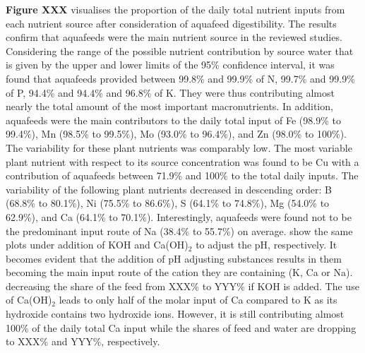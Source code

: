 \documentclass[
]{article}
\begin{document}
\textbf{Figure XXX} visualises the proportion of the daily total nutrient inputs from each nutrient source after consideration of aquafeed digestibility.
The results confirm that aquafeeds were the main nutrient source in the reviewed studies. Considering the range of the possible nutrient contribution by source water that is given by the upper and lower limits of the 95\% confidence interval, it was found that aquafeeds provided between 99.8\% and 99.9\% of N, 99.7\% and 99.9\% of P, 94.4\% and 94.4\% and 96.8\% of K. They were thus contributing almost nearly the total amount of the most important macronutrients. In addition, aquafeeds were the main contributors to the daily total input of Fe (98.9\% to 99.4\%), Mn (98.5\% to 99.5\%), Mo (93.0\% to 96.4\%), and Zn (98.0\% to 100\%). The variability for these plant nutrients was comparably low.
The most variable plant nutrient with respect to its source concentration was found to be Cu with a contribution of aquafeeds between 71.9\% and 100\% to the total daily inputs. The variability of the following plant nutrients decreased in descending order: B (68.8\% to 80.1\%), Ni (75.5\% to 86.6\%), S (64.1\% to 74.8\%), Mg (54.0\% to 62.9\%), and Ca (64.1\% to 70.1\%).
Interestingly, aquafeeds were found not to be the predominant input route of Na (38.4\% to 55.7\%) on average.
show the same plots under addition of KOH and Ca(OH)\(_{2}\) to adjust the pH, respectively.
It becomes evident that the addition of pH adjusting substances results in them becoming the main input route of the cation they are containing (K, Ca or Na).
decreasing the share of the feed from XXX\% to YYY\% if KOH is added. The use of Ca(OH)\(_{2}\) leads to only half of the molar input of Ca compared to K as its hydroxide contains two hydroxide ions. However, it is still contributing almost 100\% of the daily total Ca input while the shares of feed and water are dropping to XXX\% and YYY\%, respectively.
\end{document}
